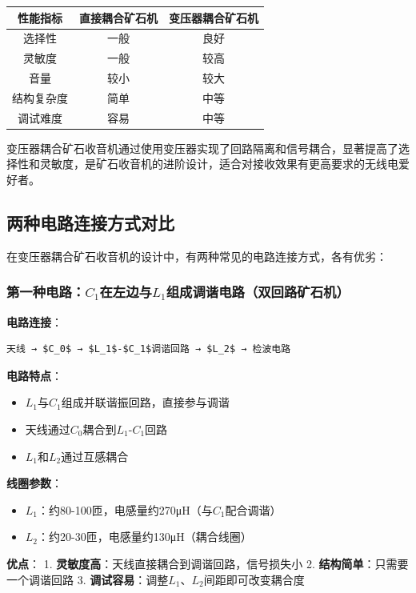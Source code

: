 \documentclass[12pt,UTF8]{ctexbook}
\begin{document}
\begin{center}
\begin{tabular}{|c|c|c|}
\hline
性能指标 & 直接耦合矿石机 & 变压器耦合矿石机 \\
\hline
选择性 & 一般 & 良好 \\
灵敏度 & 一般 & 较高 \\
音量 & 较小 & 较大 \\
结构复杂度 & 简单 & 中等 \\
调试难度 & 容易 & 中等 \\
\hline
\end{tabular}
\end{center}

变压器耦合矿石收音机通过使用变压器实现了回路隔离和信号耦合，显著提高了选择性和灵敏度，是矿石收音机的进阶设计，适合对接收效果有更高要求的无线电爱好者。

\subsection{两种电路连接方式对比}

在变压器耦合矿石收音机的设计中，有两种常见的电路连接方式，各有优劣：

\subsubsection{第一种电路：$C_1$在左边与$L_1$组成调谐电路（双回路矿石机）}

\textbf{电路连接}：\begin{verbatim}
天线 → $C_0$ → $L_1$-$C_1$调谐回路 → $L_2$ → 检波电路
\end{verbatim}

\textbf{电路特点}：\begin{itemize}
  \item $L_1$与$C_1$组成并联谐振回路，直接参与调谐
  \item 天线通过$C_0$耦合到$L_1$-$C_1$回路
  \item $L_1$和$L_2$通过互感耦合\end{itemize}

\textbf{线圈参数}：\begin{itemize}
  \item \textbf{$L_1$}：约80-100匝，电感量约270μH（与$C_1$配合调谐）
  \item \textbf{$L_2$}：约20-30匝，电感量约130μH（耦合线圈）\end{itemize}

\textbf{优点}：
1. \textbf{灵敏度高}：天线直接耦合到调谐回路，信号损失小
2. \textbf{结构简单}：只需要一个调谐回路
3. \textbf{调试容易}：调整$L_1$、$L_2$间距即可改变耦合度
\end{document}
